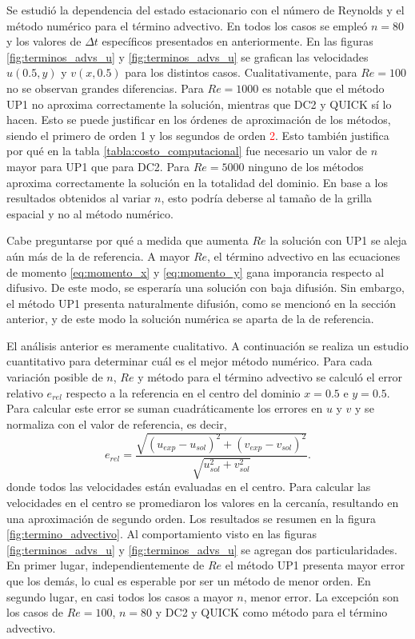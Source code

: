 \documentclass[aps,prb,twocolumn,superscriptaddress,floatfix,longbibliography,10pt]{revtex4-2}
\newif\ifptitle
\newif\ifpnumber
\newcounter{para}
\newcommand\ptitle[1]{\par\refstepcounter{para}
{\ifpnumber{\noindent\textcolor{lightgray}{\textbf{\thepara}}\indent}\fi}
{\ifptitle{\textbf{[{#1}]}}\fi}}
\begin{document}
\ptitle{Comparación cualitativa entre métodos numéricos para distintos Re}
Se estudió la dependencia del estado estacionario con el número de Reynolds y el método numérico para el término advectivo. En todos los casos se empleó $n = 80$ y los valores de $\Delta t$ específicos presentados en anteriormente. En las figuras \ref{fig:terminos_advs_u} y \ref{fig:terminos_advs_u} se grafican las velocidades $u(0.5,y)$ y $v(x,0.5)$ para los distintos casos. Cualitativamente, para $Re = 100$ no se observan grandes diferencias. Para $Re = 1000$ es notable que el método UP1 no aproxima correctamente la solución, mientras que DC2 y QUICK sí lo hacen. Esto se puede justificar en los órdenes de aproximación de los métodos, siendo el primero de orden 1 y los segundos de orden \textcolor{red}{2}. Esto también justifica por qué en la tabla \ref{tabla:costo_computacional} fue necesario un valor de $n$ mayor para UP1 que para DC2. Para $Re = 5000$ ninguno de los métodos aproxima correctamente la solución en la totalidad del dominio. En base a los resultados obtenidos al variar $n$, esto podría deberse al tamaño de la grilla espacial y no al método numérico.

Cabe preguntarse por qué a medida que aumenta $Re$ la solución con UP1 se aleja aún más de la de referencia. A mayor $Re$, el término advectivo en las ecuaciones de momento \ref{eq:momento_x} y \ref{eq:momento_y} gana imporancia respecto al difusivo. De este modo, se esperaría una solución con baja difusión. Sin embargo, el método UP1 presenta naturalmente difusión, como se mencionó en la sección anterior, y de este modo la solución numérica se aparta de la de referencia.

\ptitle{Comparación numérica entre métodos numéricos para distintos $Re$.}
El análisis anterior es meramente cualitativo. A continuación se realiza un estudio cuantitativo para determinar cuál es el mejor método numérico. Para cada variación posible de $n$, $Re$ y método para el término advectivo se calculó el error relativo $e_{rel}$ respecto a la referencia \cite{Guia1982} en el centro del dominio $x = 0.5$ e $y = 0.5$. Para calcular este error se suman cuadráticamente los errores en $u$ y $v$ y se normaliza con el valor de referencia, es decir,
\[e_{rel} = \frac{\sqrt{(u_{exp} - u_{sol})^2 + (v_{exp} - v_{sol})^2}}{\sqrt{u_{sol}^2 + v_{sol}^2}}. \]
donde todos las velocidades están evaluadas en el centro. Para calcular las velocidades en el centro se promediaron los valores en la cercanía, resultando en una aproximación de segundo orden. Los resultados se resumen en la figura \ref{fig:termino_advectivo}. Al comportamiento visto en las figuras \ref{fig:terminos_advs_u} y \ref{fig:terminos_advs_u} se agregan dos particularidades. En primer lugar, independientemente de $Re$ el método UP1 presenta mayor error que los demás, lo cual es esperable por ser un método de menor orden. En segundo lugar, en casi todos los casos a mayor $n$, menor error. La excepción son los casos de $Re = 100$, $n = 80$ y DC2 y QUICK como método para el término advectivo.
\end{document}
